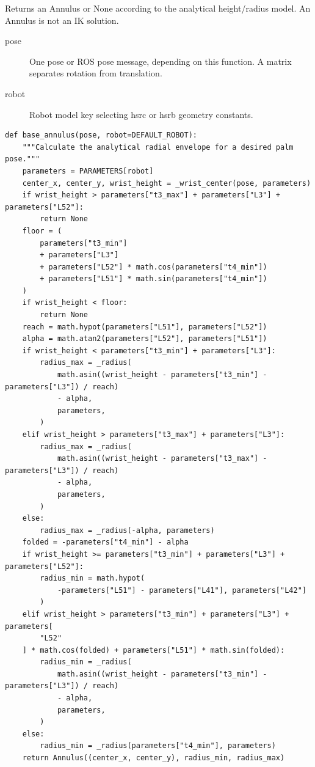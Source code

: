 \documentclass[11pt,a4paper]{book}
\begin{document}
Returns an Annulus or None according to the analytical height/radius model. An Annulus is not an IK solution.

\begin{description}
\item[pose] One pose or ROS pose message, depending on this function. A matrix separates rotation from translation.
\item[robot] Robot model key selecting hsrc or hsrb geometry constants.
\end{description}

\begin{lstlisting}[firstnumber=92]
def base_annulus(pose, robot=DEFAULT_ROBOT):
    """Calculate the analytical radial envelope for a desired palm pose."""
    parameters = PARAMETERS[robot]
    center_x, center_y, wrist_height = _wrist_center(pose, parameters)
    if wrist_height > parameters["t3_max"] + parameters["L3"] + parameters["L52"]:
        return None
    floor = (
        parameters["t3_min"]
        + parameters["L3"]
        + parameters["L52"] * math.cos(parameters["t4_min"])
        + parameters["L51"] * math.sin(parameters["t4_min"])
    )
    if wrist_height < floor:
        return None
    reach = math.hypot(parameters["L51"], parameters["L52"])
    alpha = math.atan2(parameters["L52"], parameters["L51"])
    if wrist_height < parameters["t3_min"] + parameters["L3"]:
        radius_max = _radius(
            math.asin((wrist_height - parameters["t3_min"] - parameters["L3"]) / reach)
            - alpha,
            parameters,
        )
    elif wrist_height > parameters["t3_max"] + parameters["L3"]:
        radius_max = _radius(
            math.asin((wrist_height - parameters["t3_max"] - parameters["L3"]) / reach)
            - alpha,
            parameters,
        )
    else:
        radius_max = _radius(-alpha, parameters)
    folded = -parameters["t4_min"] - alpha
    if wrist_height >= parameters["t3_min"] + parameters["L3"] + parameters["L52"]:
        radius_min = math.hypot(
            -parameters["L51"] - parameters["L41"], parameters["L42"]
        )
    elif wrist_height > parameters["t3_min"] + parameters["L3"] + parameters[
        "L52"
    ] * math.cos(folded) + parameters["L51"] * math.sin(folded):
        radius_min = _radius(
            math.asin((wrist_height - parameters["t3_min"] - parameters["L3"]) / reach)
            - alpha,
            parameters,
        )
    else:
        radius_min = _radius(parameters["t4_min"], parameters)
    return Annulus((center_x, center_y), radius_min, radius_max)


\end{lstlisting}
\end{document}
